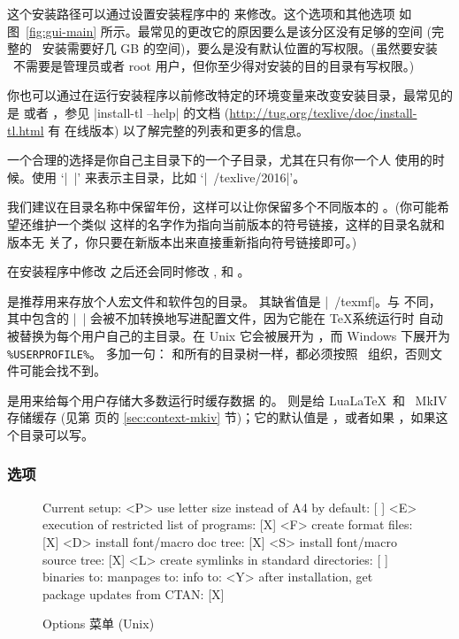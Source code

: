 \documentclass{article}
\begin{document}
这个安装路径可以通过设置安装程序中的  来修改。这个选项和其他选项
如图~\ref{fig:gui-main} 所示。最常见的更改它的原因要么是该分区没有足够的空间 (完
整的 \TL\ 安装需要好几 GB 的空间)，要么是没有默认位置的写权限。(虽然要安装
\TL\ 不需要是管理员或者 root 用户，但你至少得对安装的目的目录有写权限。)

你也可以通过在运行安装程序以前修改特定的环境变量来改变安装目录，最常见的是
 或者 ，参见
|install-tl --help| 的文档 (\url{http://tug.org/texlive/doc/install-tl.html} 有
在线版本) 以了解完整的列表和更多的信息。

一个合理的选择是你自己主目录下的一个子目录，尤其在只有你一个人
使用的时候。使用 `|~|' 来表示主目录，比如 `|~/texlive/2016|'。

我们建议在目录名称中保留年份，这样可以让你保留多个不同版本的
\TL{}。(你可能希望还维护一个类似 
这样的名字作为指向当前版本的符号链接，这样的目录名就和版本无
关了，你只要在新版本出来直接重新指向符号链接即可。)

在安装程序中修改  之后还会同时修改
,  和
。

 是推荐用来存放个人宏文件和软件包的目录。
其缺省值是 |~/texmf|。与  不同，其中包含的
|~| 会被不加转换地写进配置文件，因为它能在 \TeX 系统运行时
自动被替换为每个用户自己的主目录。在 Unix 它会被展开为
，而 Windows 下展开为 \verb|%USERPROFILE%|。
多加一句： 和所有的目录树一样，都必须按照
\TDS\ 组织，否则文件可能会找不到。

 是用来给每个用户存储大多数运行时缓存数据
的。 则是给 Lua\LaTeX\ 和 \ConTeXt\ MkIV 存储缓存
(见第 \pageref{sec:context-mkiv} 页的 \ref{sec:context-mkiv} 节)；它的默认值是
，或者如果 ，如果这个目录可以写。

\subsubsection{选项}
\label{sec:options}

\begin{figure}[tbh]
\begin{boxedverbatim}
Current setup:
 <P> use letter size instead of A4 by default: [ ]
 <E> execution of restricted list of programs: [X]
 <F> create format files:                      [X]
 <D> install font/macro doc tree:              [X]
 <S> install font/macro source tree:           [X]
 <L> create symlinks in standard directories:  [ ]
            binaries to:
            manpages to:
                info to:
 <Y> after installation, get package updates from CTAN: [X]
\end{boxedverbatim}
\caption{Options 菜单 (Unix)}\label{fig:options-text}
\end{figure}
\end{document}
